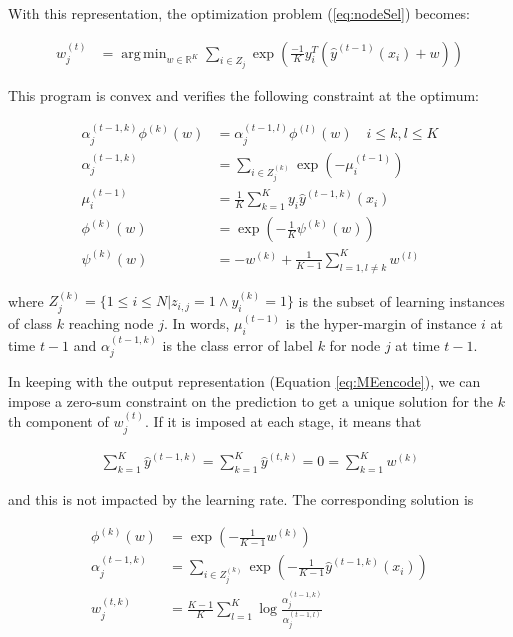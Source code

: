 \documentclass{article}
\DeclareMathOperator*{\argmin}{arg\,min}
\begin{document}
With this representation, the optimization problem (\ref{eq:nodeSel}) becomes:

\begin{align}\label{eq:MEmin}
w_j^{(t)} &=  \argmin_{w \in \mathbb{R}^K} \sum_{i \in Z_j} \exp 
\left(\frac{-1}{K} y_i^T \left(\hat{y}^{(t-1)}(x_i) + w \right)\right)
\end{align}

This program is convex and verifies the following constraint at the optimum:

\begin{align}\label{eq:MEequation}
\alpha_j^{(t-1, k)}\phi^{(k)}(w) &= \alpha_j^{(t-1, l)}\phi^{(l)}(w) \quad i 
\leq k,l \leq K \\
\alpha_j^{(t-1, k)} &= \sum_{i \in Z_j^{(k)}} \exp \left( - \mu_i^{(t-1)} 
\right) \\
\mu_i^{(t-1)} &= \frac{1}{K} \sum_{k=1}^{K} y_i \hat{y}^{(t-1, k)}(x_i) \\
\phi^{(k)}(w) &= \exp \left( - \frac{1}{K} \psi^{(k)}(w) \right) \\
\psi^{(k)}(w) &= -w^{(k)} + \frac{1}{K-1} \sum_{l=1, l\neq k}^{K}  w^{(l)}
\end{align}

where $Z_j^{(k)} = \{1 \leq i \leq N | z_{i,j} = 1 \wedge y_i^{(k)} = 1 \}$ is 
the subset of learning instances of class $k$ reaching node $j$. In words, 
$\mu_i^{(t-1)}$ is the hyper-margin of instance $i$ at time $t-1$ and 
$\alpha_j^{(t-1, k)}$ is the class error of label $k$ for node $j$ at time 
$t-1$.


In keeping with the output representation (Equation \ref{eq:MEencode}), we can 
impose a zero-sum constraint on the prediction to get a unique solution for the 
$k$th component of $w_j^{(t)}$. If it is imposed at each stage, it means that

\begin{align}\label{eq:MEzeroSum}
\sum_{k=1}^{K} \hat{y}^{(t-1, k)} = \sum_{k=1}^{K} 
\hat{y}^{(t, k)} = 0 = \sum_{k=1}^{K} w^{(k)}
\end{align}

and this is not impacted by the learning rate. The corresponding solution is

\begin{align}
\phi^{(k)}(w) &= \exp \left(-\frac{1}{K-1} w^{(k)}\right)\\ 
\label{eq:MEClsErrZS}
\alpha_j^{(t-1, k)} &= \sum_{i \in Z_j^{(k)}} \exp \left( -\frac{1}{K-1} 
\hat{y}^{(t-1, k)}(x_i) \right) \\ \label{eq:MEsolution}
w_j^{(t,k)} &= \frac{K-1}{K}  \sum_{l=1}^{K} \log \frac{\alpha_j^{(t-1, 
k)}}{\alpha_j^{(t-1, l)}} 
\end{align}
\end{document}
